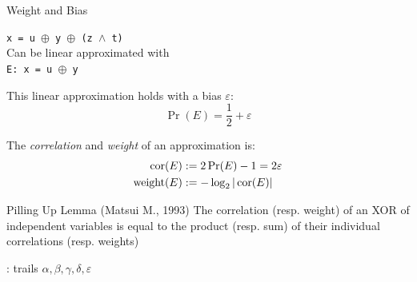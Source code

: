 \documentclass[aspectratio=169,9pt]{beamer}
\begin{document}
\begin{frame}{Weight and Bias}

\begin{center}
\texttt{x = u $\oplus$ y $\oplus$ (z $\land$ t)}\\
Can be linear approximated with\\
\texttt{E: x = u $\oplus$ y}
\end{center}

This linear approximation holds with a bias $\varepsilon$:
$$\Pr(E) = \frac{1}{2} + \varepsilon$$

The {\it correlation} and {\it weight} of an approximation is:
\begin{align*}
\operatorname{cor}(E) &:= 2\Pr(E)-1 = 2 \varepsilon\\
\operatorname{weight}(E) &:= -\log_2|\operatorname{cor}(E)|
\end{align*}

\begin{alertblock}{Pilling Up Lemma (Matsui M., 1993)}
  The correlation (resp. weight) of an XOR of independent variables is equal to
  the product (resp. sum) of their individual correlations (resp. weights)
\end{alertblock}

\end{frame}


\begin{frame}{\MiniMORUS : trails $\alpha, \beta, \gamma, \delta, \varepsilon$}

  \begin{figure}
    \substatesfalse
    \rotwfalse
    \statesfalse
    \messagefalse

    \resizebox{!}{0.78\textheight}{%
    
    }
    \resizebox{!}{0.78\textheight}{%
    
    }
    \resizebox{!}{0.78\textheight}{%
    
    }
    \resizebox{!}{0.78\textheight}{%
    
    }
    \resizebox{!}{0.78\textheight}{%
    
    }
  \end{figure}

\end{frame}


\end{document}
